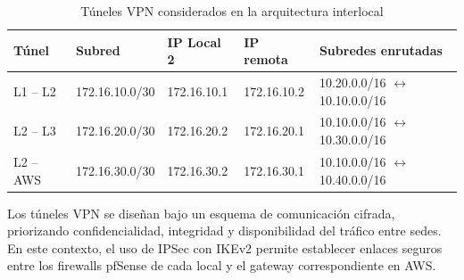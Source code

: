 \documentclass[11pt, a4paper, oneside]{report}
\begin{document}
\begin{table}[H]
  \centering
  \renewcommand{\arraystretch}{1.3}
  \footnotesize

  \begin{tabularx}{\textwidth}{@{}|L{2.2cm}|L{2.7cm}|L{2.8cm}|L{2.8cm}|X|@{}}

    \parbox[c][1.1cm][c]{\linewidth}{\centering\color{white}\bfseries\small Túnel} &
    \parbox[c][1.1cm][c]{\linewidth}{\centering\color{white}\bfseries\small Subred} &
    \parbox[c][1.1cm][c]{\linewidth}{\centering\color{white}\bfseries\small IP Local 2} &
    \parbox[c][1.1cm][c]{\linewidth}{\centering\color{white}\bfseries\small IP remota} &
    \parbox[c][1.1cm][c]{\linewidth}{\centering\color{white}\bfseries\small Subredes enrutadas} \\ \hline

    {\small L1 -- L2} &
    {\small 172.16.10.0/30} &
    {\small 172.16.10.1} &
    {\small 172.16.10.2} &
    {\small 10.20.0.0/16 \(\leftrightarrow\) 10.10.0.0/16} \\ \hline

    {\small L2 -- L3} &
    {\small 172.16.20.0/30} &
    {\small 172.16.20.2} &
    {\small 172.16.20.1} &
    {\small 10.10.0.0/16 \(\leftrightarrow\) 10.30.0.0/16} \\ \hline

    {\small L2 -- AWS} &
    {\small 172.16.30.0/30} &
    {\small 172.16.30.2} &
    {\small 172.16.30.1} &
    {\small 10.10.0.0/16 \(\leftrightarrow\) 10.40.0.0/16} \\ \hline

  \end{tabularx}

  \caption{Túneles VPN considerados en la arquitectura interlocal}
  \label{tab:tuneles_vpn_interlocal}
\end{table}

Los túneles VPN se diseñan bajo un esquema de comunicación cifrada, priorizando confidencialidad, integridad y disponibilidad del tráfico entre sedes. En este contexto, el uso de IPSec con IKEv2 permite establecer enlaces seguros entre los firewalls pfSense de cada local y el gateway correspondiente en AWS.
\end{document}
